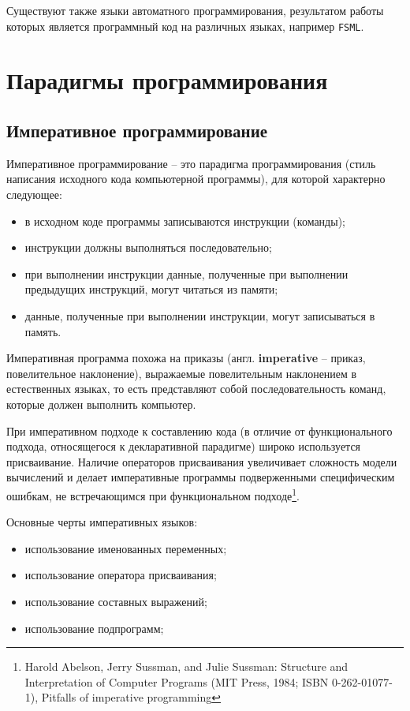 \documentclass[12pt, twoside]{report}
\begin{document}
Существуют также языки автоматного программирования, результатом работы которых является программный 
код на различных языках, например \texttt{FSML}\cite{Lagunov:FSML}.

\chapter*{Парадигмы программирования}

\section*{Императивное программирование}

Императивное программирование -- это парадигма программирования (стиль написания исходного кода компьютерной программы), для которой характерно следующее:

\begin{itemize}
  \item в исходном коде программы записываются инструкции (команды);
  \item инструкции должны выполняться последовательно;
  \item при выполнении инструкции данные, полученные при выполнении предыдущих инструкций, могут читаться из памяти;
  \item данные, полученные при выполнении инструкции, могут записываться в память.
\end{itemize}

Императивная программа похожа на приказы (англ. \textbf{imperative} -- приказ, повелительное наклонение), выражаемые повелительным наклонением в естественных языках, то есть представляют собой последовательность команд, которые должен выполнить компьютер.

При императивном подходе к составлению кода (в отличие от функционального подхода, относящегося к декларативной парадигме) широко используется присваивание. Наличие операторов присваивания увеличивает сложность модели вычислений и делает императивные программы подверженными специфическим ошибкам, не встречающимся при функциональном подходе\footnote{Harold Abelson, Jerry Sussman, and Julie Sussman: Structure and Interpretation of Computer Programs (MIT Press, 1984; ISBN 0-262-01077-1), Pitfalls of imperative programming}.

Основные черты императивных языков:
\begin{itemize}
  \item использование именованных переменных;
  \item использование оператора присваивания;
  \item использование составных выражений;
  \item использование подпрограмм;
\end{itemize}
\end{document}
